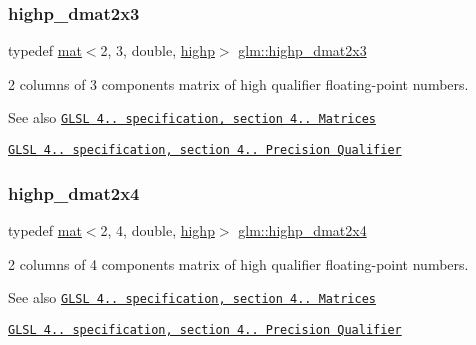 \subsubsection{\texorpdfstring{highp\+\_\+dmat2x3}{highp\_dmat2x3}}
{\footnotesize\ttfamily typedef \hyperlink{structglm_1_1mat}{mat}$<$2, 3, double, \hyperlink{namespaceglm_a36ed105b07c7746804d7fdc7cc90ff25ac6f7eab42eacbb10d59a58e95e362074}{highp}$>$ \hyperlink{group__core__precision_gad7de433cb7f79959a191fc5c64fbfc4e}{glm\+::highp\+\_\+dmat2x3}}

2 columns of 3 components matrix of high qualifier floating-\/point numbers.

\begin{DoxySeeAlso}{See also}
\href{http://www.opengl.org/registry/doc/GLSLangSpec.4.20.8.pdf}{\tt G\+L\+SL 4.. specification, section 4.. Matrices} 

\href{http://www.opengl.org/registry/doc/GLSLangSpec.4.20.8.pdf}{\tt G\+L\+SL 4.. specification, section 4.. Precision Qualifier} 
\end{DoxySeeAlso}
\mbox{\label{group__core__precision_gaea7c625705d849f1a55c9bfcb2585875}} 
\subsubsection{\texorpdfstring{highp\+\_\+dmat2x4}{highp\_dmat2x4}}
{\footnotesize\ttfamily typedef \hyperlink{structglm_1_1mat}{mat}$<$2, 4, double, \hyperlink{namespaceglm_a36ed105b07c7746804d7fdc7cc90ff25ac6f7eab42eacbb10d59a58e95e362074}{highp}$>$ \hyperlink{group__core__precision_gaea7c625705d849f1a55c9bfcb2585875}{glm\+::highp\+\_\+dmat2x4}}

2 columns of 4 components matrix of high qualifier floating-\/point numbers.

\begin{DoxySeeAlso}{See also}
\href{http://www.opengl.org/registry/doc/GLSLangSpec.4.20.8.pdf}{\tt G\+L\+SL 4.. specification, section 4.. Matrices} 

\href{http://www.opengl.org/registry/doc/GLSLangSpec.4.20.8.pdf}{\tt G\+L\+SL 4.. specification, section 4.. Precision Qualifier} 
\end{DoxySeeAlso}
\mbox{\label{group__core__precision_ga2e305d56d01a4553a7fd2b6d2c580fa0}} 
